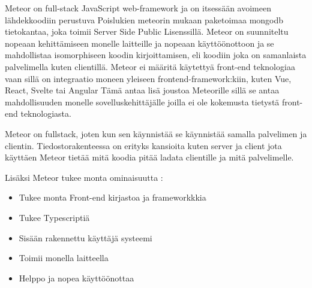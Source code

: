 \documentclass[11pt,a4paper,titlepage,oneside]{article}
\begin{document}

%



Meteor on full-stack JavaScript web-framework ja on itsessään avoimeen lähdekkoodiin perustuva 
Poislukien meteorin mukaan paketoimaa mongodb tietokantaa, joka toimii Server Side Public Lisenssillä.
Meteor on suunniteltu nopeaan kehittämiseen monelle laitteille ja nopeaan käyttöönottoon ja se mahdollistaa isomorphiseen koodin kirjoittamisen, 
eli koodiin joka on samanlaista palvelimella kuten clientillä. %
Meteor ei määritä käytettyä front-end teknologiaa vaan sillä on integraatio moneen yleiseen frontend-framework:kiin, kuten Vue, React, Svelte tai Angular 
Tämä antaa lisä joustoa Meteorille sillä se antaa mahdollisuuden monelle sovelluskehittäjälle joilla ei ole kokemusta tietystä front-end teknologiasta.
\medskip

Meteor on fullstack, joten kun sen käynnistää se käynnistää samalla palvelimen ja clientin.
Tiedostorakenteessa on erityks kansioita kuten server ja client jota käyttäen Meteor tietää mitä koodia pitää ladata clientille ja mitä palvelimelle.
\medskip



    

Lisäksi Meteor tukee monta ominaisuutta :
\begin{itemize}
    \item Tukee monta Front-end kirjastoa ja frameworkkkia
    \item Tukee Typescriptiä
    \item Sisään rakennettu käyttäjä systeemi
    \item Toimii monella laitteella
    \item Helppo ja nopea käyttöönottaa 
\end{itemize}
\medskip
\end{document}

